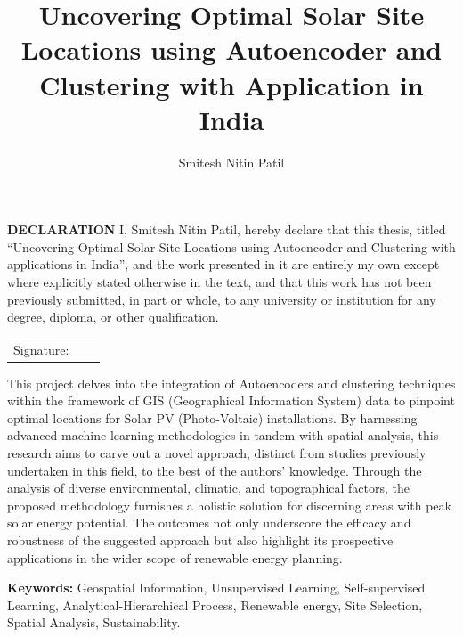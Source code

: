 \documentclass[a4paper,12pt]{Classes/RoboticsLaTeX}
\title{\Large{Uncovering Optimal Solar Site
Locations using Autoencoder and Clustering with Application in India}}
\author{Smitesh Nitin Patil}
\begin{document}
	\begin{spacing}{1}
		\maketitle
	\end{spacing}
	
	
	\setcounter{secnumdepth}{3}
	\setcounter{tocdepth}{3}
	
	\frontmatter
	
	\textbf{DECLARATION} 
	I, Smitesh Nitin Patil, hereby declare that this thesis, titled ``Uncovering Optimal Solar Site
	Locations using Autoencoder and Clustering with applications in India'', and the work presented in it are entirely my own except where explicitly stated otherwise in the text, and that this work has not been previously submitted, in part or whole, to any university or institution for any degree, diploma, or other qualification. 
	\newline
	
	\begin{tabular}{@{}p{.5in}p{4in}@{}}
		Signature: & ~~\hrulefill \\
	\end{tabular}
	
	
	
	
	\begin{abstracts}
		This project delves into the integration of Autoencoders and clustering techniques within the framework of GIS (Geographical Information System) 
		data to pinpoint optimal locations for Solar PV (Photo-Voltaic) installations. By harnessing advanced machine learning methodologies in tandem with 
		spatial analysis, this research aims to carve out a novel approach, distinct from studies previously undertaken in this field, to the best of the authors' 
		knowledge. Through the analysis of diverse environmental, climatic, and topographical factors, the proposed methodology furnishes a holistic solution for 
		discerning areas with peak solar energy potential. The outcomes not only underscore the efficacy and robustness of the suggested approach but also highlight 
		its prospective applications in the wider scope of renewable energy planning.
		
		\textbf{Keywords: } Geospatial Information, Unsupervised Learning, Self-supervised
		Learning, Analytical-Hierarchical Process, Renewable energy, Site Selection,
		Spatial Analysis, Sustainability.
	\end{abstracts}
	
\end{document}
